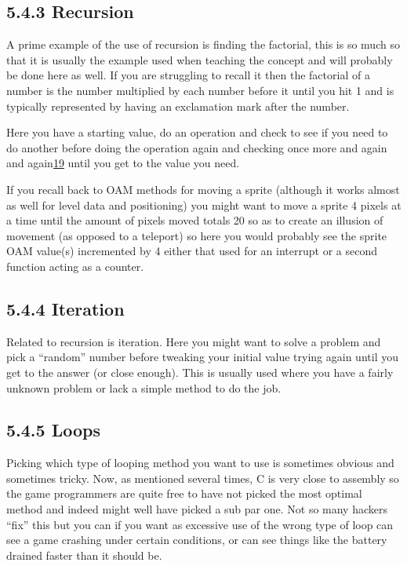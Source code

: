 \documentclass[
]{book}
\begin{document}
\hypertarget{recursion}{%
\subsection{5.4.3 Recursion}\label{recursion}}

A prime example of the use of recursion is finding the factorial, this is so much so that it is usually the example used when teaching the concept and will probably be done here as well. If you are struggling to recall it then the factorial of a number is the number multiplied by each number before it until you hit 1 and is typically represented by having an exclamation mark after the number.

Here you have a starting value, do an operation and check to see if you need to do another before doing the operation again and checking once more and again and again\href{romhacking202020.html\#fn19x0}{19} until you get to the value you need.

If you recall back to OAM methods for moving a sprite (although it works almost as well for level data and positioning) you might want to move a sprite 4 pixels at a time until the amount of pixels moved totals 20 so as to create an illusion of movement (as opposed to a teleport) so here you would probably see the sprite OAM value(s) incremented by 4 either that used for an interrupt or a second function acting as a counter.

\hypertarget{iteration}{%
\subsection{5.4.4 Iteration}\label{iteration}}

Related to recursion is iteration. Here you might want to solve a problem and pick a ``random'' number before tweaking your initial value trying again until you get to the answer (or close enough). This is usually used where you have a fairly unknown problem or lack a simple method to do the job.

\hypertarget{loops}{%
\subsection{5.4.5 Loops}\label{loops}}

Picking which type of looping method you want to use is sometimes obvious and sometimes tricky. Now, as mentioned several times, C is very close to assembly so the game programmers are quite free to have not picked the most optimal method and indeed might well have picked a sub par one. Not so many hackers ``fix'' this but you can if you want as excessive use of the wrong type of loop can see a game crashing under certain conditions, or can see things like the battery drained faster than it should be.
\end{document}
